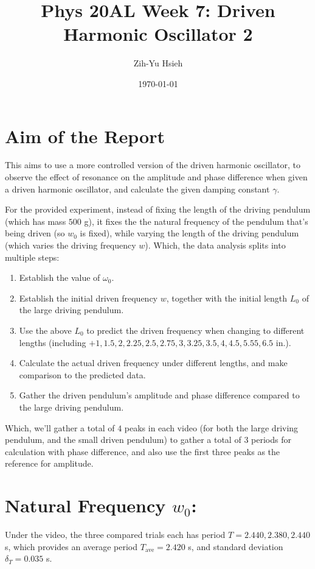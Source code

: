 \documentclass{article}
\title{Phys 20AL Week 7: Driven Harmonic Oscillator 2}
\author{Zih-Yu Hsieh}
\date{\today}
\begin{document}
\maketitle

\tableofcontents

\newpage

\section{Aim of the Report}
This aims to use a more controlled version of the driven harmonic oscillator, to observe the effect of resonance on the amplitude and phase difference when given a driven harmonic oscillator, and calculate the given damping constant $\gamma$.

\hfil

For the provided experiment, instead of fixing the length of the driving pendulum (which has mass $500$ g), it fixes the the natural frequency of the pendulum that's being driven (so $w_0$ is fixed), while varying the length of the driving pendulum (which varies the driving frequency $w$). Which, the data analysis splits into multiple steps:
\begin{enumerate}
    \item Establish the value of $\omega_0$.
    \item Establish the initial driven frequency $w$, together with the initial length $L_0$ of the large driving pendulum.
    \item Use the above $L_0$ to predict the driven frequency when changing to different lengths (including $+1,1.5,2,2.25,2.5,2.75,3,3.25,3.5,4,4.5,5.55,6.5$ in.).
    \item Calculate the actual driven frequency under different lengths, and make comparison to the predicted data.
    \item Gather the driven pendulum's amplitude and phase difference compared to the large driving pendulum.
\end{enumerate}
Which, we'll gather a total of $4$ peaks in each video (for both the large driving pendulum, and the small driven pendulum) to gather a total of $3$ periods for calculation with phase difference, and also use the first three peaks as the reference for amplitude.

\newpage

\section{Natural Frequency $w_0$:}
Under the video, the three compared trials each has period $T = 2.440, 2.380, 2.440$ s, which provides an average period $T_\text{ave} = 2.420$ s, and standard deviation $\delta_T =0.035$ s.
\end{document}
